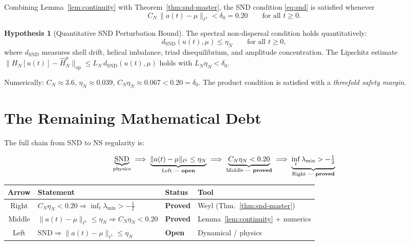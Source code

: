 \documentclass[12pt]{amsart}
\theoremstyle{definition}
\newtheorem{hypothesis}[theorem]{Hypothesis}
\newcommand{\HN}{\widehat{H}_N^\mu}
\newcommand{\lmin}{\lambda_{\min}}
\newcommand{\dSND}{d_{\mathrm{SND}}}
\begin{document}
Combining Lemma~\ref{lem:continuity} with Theorem~\ref{thm:snd-master},
the SND condition \eqref{eq:snd} is satisfied whenever
\begin{equation}
\label{eq:product}
C_N\,\|a(t)-\mu\|_{\ell^1} < \delta_0 = 0.20
\qquad\text{for all }t\ge0.
\end{equation}

\begin{hypothesis}[Quantitative SND Perturbation Bound]
\label{hyp:snd}
The spectral non-dispersal condition holds quantitatively:
\[
\dSND(u(t),\mu) \le \eta_N \qquad\text{for all }t\ge0,
\]
where $\dSND$ measures shell drift, helical imbalance,
triad disequilibrium, and amplitude concentration.
The Lipschitz estimate
$\|H_N[u(t)]-\HN\|_{\mathrm{op}}\le L_N\,\dSND(u(t),\mu)$
holds with $L_N\eta_N<\delta_0$.
\end{hypothesis}

\noindent
Numerically: $C_N\approx3.6$, $\eta_N\approx0.039$,
$C_N\eta_N\approx0.067<0.20=\delta_0$.
The product condition is satisfied with a \emph{threefold safety margin}.

\section{The Remaining Mathematical Debt}
\label{sec:debt}

The full chain from SND to NS regularity is:

\begin{equation}
\label{eq:hierarchy}
\underbrace{\mathrm{SND}}_{\text{physics}}
\;\Longrightarrow\;
\underbrace{\|a(t)-\mu\|_{\ell^1}\le\eta_N}_{\text{Left — \textbf{open}}}
\;\Longrightarrow\;
\underbrace{C_N\eta_N<0.20}_{\text{Middle — \textbf{proved}}}
\;\Longrightarrow\;
\underbrace{\inf_t\lmin>-\tfrac{1}{2}}_{\text{Right — \textbf{proved}}}
\end{equation}

\begin{center}
\renewcommand{\arraystretch}{1.4}
\begin{tabular}{clll}
\toprule
\textbf{Arrow} & \textbf{Statement} & \textbf{Status} & \textbf{Tool} \\
\midrule
Right & $C_N\eta_N<0.20\Rightarrow\inf_t\lmin>-\tfrac12$
      & \textbf{Proved} & Weyl (Thm.~\ref{thm:snd-master}) \\
Middle & $\|a(t)-\mu\|_{\ell^1}\le\eta_N\Rightarrow C_N\eta_N<0.20$
      & \textbf{Proved} & Lemma~\ref{lem:continuity} + numerics \\
Left & $\mathrm{SND}\Rightarrow\|a(t)-\mu\|_{\ell^1}\le\eta_N$
      & \textbf{Open} & Dynamical / physics \\
\bottomrule
\end{tabular}
\end{center}
\end{document}
